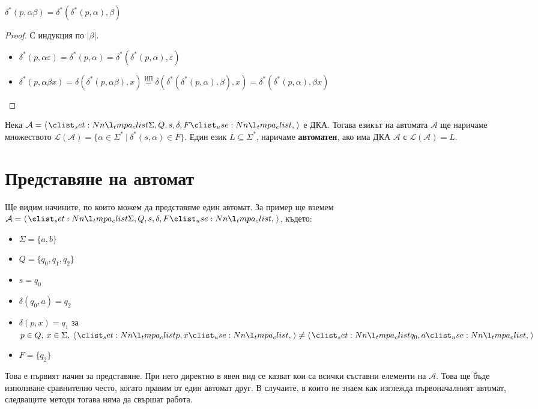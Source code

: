 \begin{claim}
    $\delta^*(p, \alpha \beta) = \delta^*(\delta^*(p, \alpha), \beta)$
\end{claim}

\begin{proof}
    С индукция по $|\beta|$.
    \begin{itemize}
        \item $\delta^*(p, \alpha \varepsilon) = \delta^*(p, \alpha) = \delta^*(\delta^*(p, \alpha), \varepsilon)$
        \item $\delta^*(p, \alpha \beta x) = \delta(\delta^*(p, \alpha \beta), x) \stackrel{\text{ИП}}{=} \delta(\delta^*(\delta^*(p, \alpha), \beta), x) = \delta^*(\delta^*(p, \alpha), \beta x)$
    \end{itemize}
\end{proof}

\begin{definition}
    Нека $\mathcal{A} = \opair{\Sigma, Q, s, \delta, F}$ е ДКА.
    Тогава езикът на автомата $\mathcal{A}$ ще наричаме множеството
    $\mathcal{L}(\mathcal{A}) = \{ \alpha \in \Sigma^* \: | \: \delta^*(s, \alpha) \in F \}$.
    Един език $L \subseteq \Sigma^*$, наричаме \textbf{автоматен}, ако има ДКА $\mathcal{A}$ с $\mathcal{L}(\mathcal{A}) = L$.
\end{definition}

\section{Представяне на автомат}

Ще видим начините, по които можем да представяме един автомат.
За пример ще вземем $\mathcal{A} = \opair{\Sigma, Q, s, \delta, F}$, където:
\begin{itemize}
    \item $\Sigma = \{ a, b \}$
    \item $Q = \{ q_0, q_1, q_2 \}$
    \item $s = q_0$
    \item $\delta(q_0, a) = q_2$
    \item $\delta(p, x) = q_1$ за $p \in Q, \: x \in \Sigma, \: \opair{p, x} \neq \opair{q_0, a}$
    \item $F = \{ q_2 \}$
\end{itemize}

Това е първият начин за представяне.
При него директно в явен вид се казват кои са всички съставни елементи на $\mathcal{A}$.
Това ще бъде използване сравнително често, когато правим от един автомат друг.
В случаите, в които не знаем как изглежда първоначалният автомат, следващите методи тогава няма да свършат работа. \\


